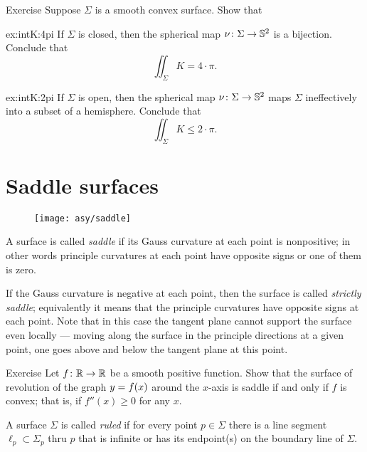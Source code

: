 \begin{thm}{Exercise}\label{ex:intK}
Suppose $\Sigma$ is a smooth convex surface.
Show that 

\begin{subthm}{ex:intK:4pi}
If $\Sigma$ is closed, then the spherical map $\nu\colon\Sigma\to \mathbb{S}^2$ is a bijection. Conclude that 
\[\iint_\Sigma K=4\cdot\pi.\]
\end{subthm}
\begin{subthm}{ex:intK:2pi}
If $\Sigma$ is open, then  the spherical map $\nu\colon\Sigma\to \mathbb{S}^2$
maps $\Sigma$ ineffectively into a subset of a hemisphere. Conclude that 
\[\iint_\Sigma K\le 2\cdot\pi.\]
\end{subthm}
\end{thm}



\section{Saddle surfaces}\label{sec:saddle}

\begin{wrapfigure}{r}{43 mm}
\vskip-8mm
\centering
\texttt{[image: asy/saddle]}
\vskip0mm
\end{wrapfigure}

A surface is called \emph{saddle} if its Gauss curvature at each point is nonpositive;
in other words principle curvatures at each point have opposite signs or one of them is zero.

If the Gauss curvature is negative at each point,
then the surface is called \emph{strictly saddle};
equivalently it means that the principle curvatures have opposite signs at each point.
Note that in this case the tangent plane cannot support the surface even locally --- moving along the surface in the principle directions at a given point, one goes above and below the tangent plane at this point.  


\begin{thm}{Exercise}\label{ex:convex-revolution}
Let $f\colon\mathbb{R}\to\mathbb{R}$ be a smooth positive function.
Show that the surface of revolution of the graph $y\z=f(x)$ around the $x$-axis
 is saddle if and only if $f$ is convex; that is, if $f''(x)\ge0$ for any $x$.
\end{thm}

A surface $\Sigma$ is called \emph{ruled} if for every point $p\in \Sigma$ there is a line segment $\ell_p\subset \Sigma_p$ thru $p$ that is infinite or has its endpoint(s) on the boundary line of $\Sigma$.

